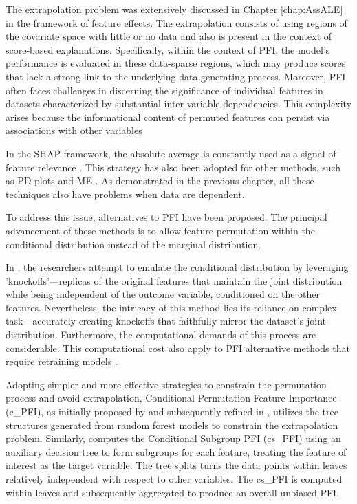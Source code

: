 The extrapolation problem was extensively discussed in Chapter \ref{chap:AssALE} in the framework of feature effects. The extrapolation consists of using regions of the covariate space with little or no data and also is present in the context of score-based explanations. Specifically, within the context of PFI, the model's performance is evaluated in these data-sparse regions, which may produce scores that lack a strong link to the underlying data-generating process. Moreover, PFI often faces challenges in discerning the significance of individual features in datasets characterized by substantial inter-variable dependencies. This complexity arises because the informational content of permuted features can persist via associations with other variables \cite{Strobl2008ConditionalForests, Hooker2019UnrestrictedImportance}

In the SHAP framework, the absolute average is constantly used as a signal of feature relevance \cite{Scavuzzo2022FeatureSHAP}. This strategy has also been adopted for other methods, such as PD plots \cite{Greenwell2018AMeasure} and ME 
\cite{Long2021UsingOutcomes}. As demonstrated in the previous chapter, all these techniques also have problems when data are dependent.

To address this issue, alternatives to PFI have been proposed. The principal advancement of these methods is to allow feature permutation within the conditional distribution instead of the marginal distribution.

In \cite{Candes2018PanningSelection, Watson2021TestingAlgorithms}, the researchers attempt to emulate the conditional distribution by leveraging 'knockoffs'—replicas of the original features that maintain the joint distribution while being independent of the outcome variable, conditioned on the other features. Nevertheless, the intricacy of this method lies its reliance on complex task -  accurately creating knockoffs that faithfully mirror the dataset's joint distribution. Furthermore, the computational demands of this process are considerable. This computational cost also apply to PFI alternative methods that require retraining models \cite{Hooker2019UnrestrictedImportance, JingLeiMaxGSell2018Distribution-FreeRegression, Gregorutti2017CorrelationForests}.

Adopting simpler and more effective strategies to constrain the permutation process and avoid extrapolation, Conditional Permutation Feature Importance (c\_PFI), as initially proposed by \cite{Strobl2008ConditionalForests} and subsequently refined in \cite{Debeer2020ConditionalRevisited}, utilizes the tree structures generated from random forest models to constrain the extrapolation problem. Similarly, \cite{Molnar2023Model-agnosticApproach} computes the Conditional Subgroup PFI (cs\_PFI) using an auxiliary decision tree to form subgroups for each feature, treating the feature of interest as the target variable. The tree splits turns the data points within leaves relatively independent with respect to other variables. The cs\_PFI is computed within leaves and subsequently aggregated to produce an overall unbiased PFI.

